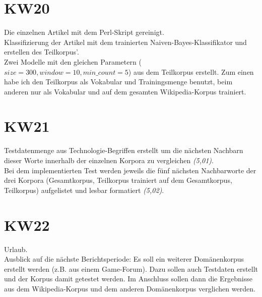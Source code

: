 \documentclass[11pt,a4paper]{article}
\begin{document}
\section*{KW20}
Die einzelnen Artikel mit dem Perl-Skript gereinigt.
\\Klassifizierung der Artikel mit dem trainierten Naiven-Bayes-Klassifikator und erstellen des Teilkorpus'.
\\Zwei Modelle mit den gleichen Parametern ($size=300, window=10, min\_count=5$) aus dem Teilkorpus erstellt. Zum einen habe ich den Teilkorpus als Vokabular und Trainingsmenge benutzt, beim anderen nur als Vokabular und auf dem gesamten Wikipedia-Korpus trainiert.

\section*{KW21}
Testdatenmenge aus Technologie-Begriffen erstellt um die nächsten Nachbarn dieser Worte innerhalb der einzelnen Korpora zu vergleichen \textit{(5,01)}.
\\Bei dem implementierten Test werden jeweils die fünf nächsten Nachbarworte der drei Korpora (Gesamtkorpus, Teilkorpus trainiert auf dem Gesamtkorpus, Teilkorpus) aufgelistet und lesbar formatiert \textit{(5,02)}.
\\

\section*{KW22}
Urlaub.\\

Ausblick auf die nächste Berichtsperiode:
Es soll ein weiterer Domänenkorpus erstellt werden (z.B. aus einem Game-Forum). Dazu sollen auch Testdaten erstellt und der Korpus damit getestet werden. Im Anschluss sollen dann die Ergebnisse aus dem Wikipedia-Korpus und dem anderen Domänenkorpus verglichen werden.
\end{document}
